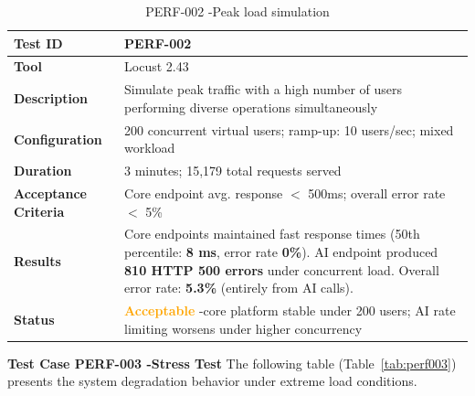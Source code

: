 \begin{table}[H]
\caption{PERF-002 -Peak load simulation}
\centering
\begin{tabular}{|l|p{10cm}|}
\hline
\textbf{Test ID} & PERF-002 \\
\hline
\textbf{Tool} & Locust 2.43 \\
\hline
\textbf{Description} & Simulate peak traffic with a high number of users performing diverse operations simultaneously \\
\hline
\textbf{Configuration} & 200 concurrent virtual users; ramp-up: 10 users/sec; mixed workload \\
\hline
\textbf{Duration} & 3 minutes; 15,179 total requests served \\
\hline
\textbf{Acceptance Criteria} & Core endpoint avg. response $<$ 500ms; overall error rate $<$ 5\% \\
\hline
\textbf{Results} & Core endpoints maintained fast response times (50th percentile: \textbf{8 ms}, error rate \textbf{0\%}). AI endpoint produced \textbf{810 HTTP 500 errors} under concurrent load. Overall error rate: \textbf{5.3\%} (entirely from AI calls). \\
\hline
\textbf{Status} & \textcolor{orange}{\textbf{Acceptable}} -core platform stable under 200 users; AI rate limiting worsens under higher concurrency \\
\hline
\end{tabular}

\label{tab:perf002}
\end{table}

\textbf{Test Case PERF-003 -Stress Test}
The following table (Table~\ref{tab:perf003}) presents the system degradation behavior under extreme load conditions.


